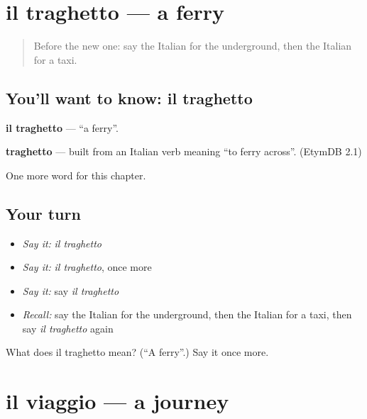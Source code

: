 \section[il traghetto]{il traghetto — a ferry}

\label{lesson:IT-C92-traghetto}



\begin{quote}
Before the new one: say the Italian for the underground, then the Italian for a taxi.
\end{quote}

\subsection*{You'll want to know: il traghetto}
\textbf{il traghetto} — \textquotedblleft{}a ferry\textquotedblright{}.

\begin{cousinweb}
\textbf{traghetto} — built from an Italian verb meaning \textquotedblleft{}to ferry across\textquotedblright{}. (EtymDB 2.1)
\end{cousinweb}

\begin{grammarlens}[title={What you've built}]
One more word for this chapter.
\end{grammarlens}

\subsection*{Your turn}
\begin{itemize}
\raggedright
  \item \emph{Say it:} \emph{il traghetto}
  \item \emph{Say it:} \emph{il traghetto}, once more
  \item \emph{Say it:} say \emph{il traghetto}
  \item \emph{Recall:} say the Italian for the underground, then the Italian for a taxi, then say \emph{il traghetto} again
\end{itemize}

\begin{tcolorbox}[breakable,colback=teal!4,colframe=teal!35!black,title={Before you move on}]
What does il traghetto mean? (\textquotedblleft{}A ferry\textquotedblright{}.) Say it once more.
\end{tcolorbox}
\section[il viaggio]{il viaggio — a journey}

